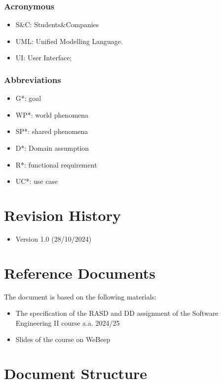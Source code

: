 \subsubsection{Acronymous}
\begin{itemize}
    \item S\&C: Students\&Companies
    \item UML: Unified Modelling Language.
    \item UI: User Interface;
\end{itemize}

\subsubsection{Abbreviations}
\begin{itemize}
    \item G*: goal
    \item WP*: world phenomena
    \item SP*: shared phenomena
    \item D*: Domain assumption
    \item R*: functional requirement
    \item UC*: use case
\end{itemize}
  
\section{Revision History}

\begin{itemize}
    \item Version 1.0 (28/10/2024)
\end{itemize}

\section{Reference Documents}

The document is based on the following materials:

\begin{itemize}
    \item The specification of the RASD and DD assignment of the Software Engineering II course a.a. 2024/25 
    \item Slides of the course on WeBeep
\end{itemize}


\section{Document Structure}

